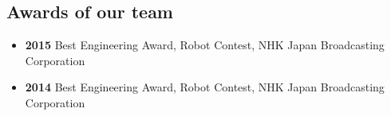 \documentclass[10pt]{article} %
\begin{document}
\subsection{Awards of our team}

\begin{itemize}
 \item \textbf{2015} Best Engineering Award, Robot Contest, NHK Japan Broadcasting Corporation
 \item \textbf{2014} Best Engineering Award, Robot Contest, NHK Japan Broadcasting Corporation
\end{itemize}


%


%
%
\end{document}
